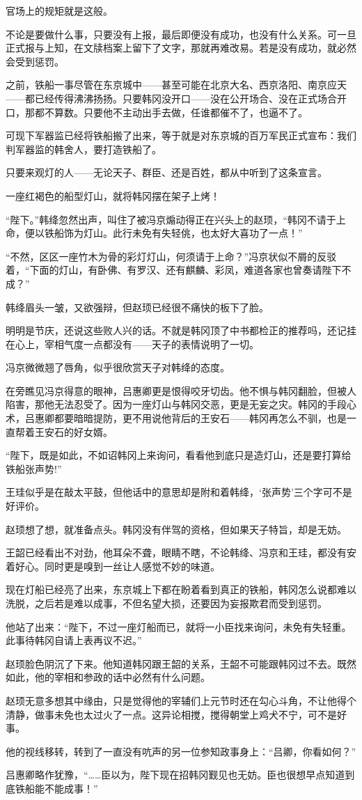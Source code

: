 官场上的规矩就是这般。

不论是要做什么事，只要没有上报，最后即便没有成功，也没有什么关系。可一旦正式报与上知，在文牍档案上留下了文字，那就再难改易。若是没有成功，就必然会受到惩罚。

之前，铁船一事尽管在东京城中——甚至可能在北京大名、西京洛阳、南京应天——都已经传得沸沸扬扬。只要韩冈没开口——没在公开场合、没在正式场合开口，那都不算数。只要他不主动出手去做，任谁都催不了，也逼不了。

可现下军器监已经将铁船搬了出来，等于就是对东京城的百万军民正式宣布：我们判军器监的韩舍人，要打造铁船了。

只要来观灯的人——无论天子、群臣、还是百姓，都从中听到了这条宣言。

一座红褐色的船型灯山，就将韩冈摆在架子上烤！

“陛下。”韩绛忽然出声，叫住了被冯京煽动得正在兴头上的赵顼，“韩冈不请于上命，便以铁船饰为灯山。此行未免有失轻佻，也太好大喜功了一点！”

“不然，区区一座竹木为骨的彩灯灯山，何须请于上命？”冯京状似不屑的反驳着，“下面的灯山，有卧佛、有罗汉、还有麒麟、彩凤，难道各家也曾奏请陛下不成？”

韩绛眉头一皱，又欲强辩，但赵顼已经很不痛快的板下了脸。

明明是节庆，还说这些败人兴的话。不就是韩冈顶了中书都检正的推荐吗，还记挂在心上，宰相气度一点都没有——天子的表情说明了一切。

冯京微微翘了唇角，似乎很欣赏天子对韩绛的态度。

在旁瞧见冯京得意的眼神，吕惠卿更是恨得咬牙切齿。他不惧与韩冈翻脸，但被人陷害，那他无法忍受了。因为一座灯山与韩冈交恶，更是无妄之灾。韩冈的手段心术，吕惠卿都要暗暗提防，更不用说他背后的王安石——韩冈再怎么不驯，也是一直帮着王安石的好女婿。

“陛下，既是如此，不如诏韩冈上来询问，看看他到底只是造灯山，还是要打算给铁船张声势!”

王珪似乎是在敲太平鼓，但他话中的意思却是附和着韩绛，‘张声势’三个字可不是好评价。

赵顼想了想，就准备点头。韩冈没有伴驾的资格，但如果天子特旨，却是无妨。

王韶已经看出不对劲，他耳朵不聋，眼睛不瞎，不论韩绛、冯京和王珪，都没有安着好心。同时更是嗅到一丝让人感觉不妙的味道。

现在灯船已经亮了出来，东京城上下都在盼着看到真正的铁船，韩冈怎么说都难以洗脱，之后若是难以成事，不但名望大损，还要因为妄报欺君而受到惩罚。

他站了出来：“陛下，不过一座灯船而已，就将一小臣找来询问，未免有失轻重。此事待韩冈自请上表再议不迟。”

赵顼脸色阴沉了下来。他知道韩冈跟王韶的关系，王韶不可能跟韩冈过不去。既然如此，他的宰相和参政的话中必然有什么问题。

赵顼无意多想其中缘由，只是觉得他的宰辅们上元节时还在勾心斗角，不让他得个清静，做事未免也太过火了一点。这异论相搅，搅得朝堂上鸡犬不宁，可不是好事。

他的视线移转，转到了一直没有吭声的另一位参知政事身上：“吕卿，你看如何？”

吕惠卿略作犹豫，“……臣以为，陛下现在招韩冈觐见也无妨。臣也很想早点知道到底铁船能不能成事！”

